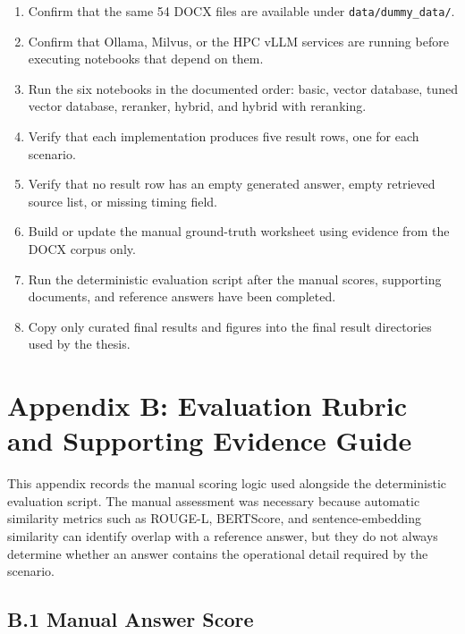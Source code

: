 \begin{enumerate}
    \item Confirm that the same 54 DOCX files are available under \texttt{data/dummy\_data/}.
    \item Confirm that Ollama, Milvus, or the \ac{HPC} vLLM services are running before executing notebooks that depend on them.
    \item Run the six notebooks in the documented order: basic, vector database, tuned vector database, reranker, hybrid, and hybrid with reranking.
    \item Verify that each implementation produces five result rows, one for each scenario.
    \item Verify that no result row has an empty generated answer, empty retrieved source list, or missing timing field.
    \item Build or update the manual ground-truth worksheet using evidence from the DOCX corpus only.
    \item Run the deterministic evaluation script after the manual scores, supporting documents, and reference answers have been completed.
    \item Copy only curated final results and figures into the final result directories used by the thesis.
\end{enumerate}

\newpage
\section*{Appendix B: Evaluation Rubric and Supporting Evidence Guide}

This appendix records the manual scoring logic used alongside the deterministic evaluation script. The manual assessment was necessary because automatic similarity metrics such as \acs{ROUGE-L}, \acs{BERTScore}, and sentence-embedding similarity can identify overlap with a reference answer, but they do not always determine whether an answer contains the operational detail required by the scenario.

\subsection*{B.1 Manual Answer Score}

